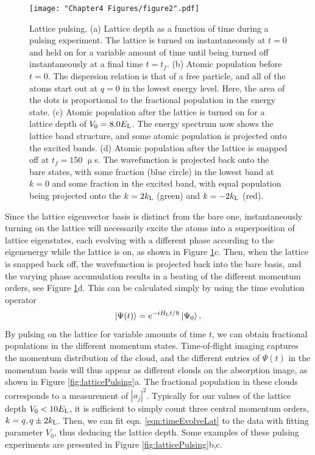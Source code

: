 \begin{figure}
\texttt{[image: "Chapter4 Figures/figure2".pdf]}
\caption[Lattice pulsing]{Lattice pulsing. (a) Lattice depth as a function of time during a pulsing experiment. The lattice is turned on instantaneously at $t=0$ and held on for a variable amount of time until being turned off instantaneously at a final time $t=t_f$. (b) Atomic population before $t=0$. The dispersion relation is that of a free particle, and all of the atoms start out at $q=0$ in the lowest energy level. Here, the area of the dots is proportional to the fractional population in the energy state. (c) Atomic population after the lattice is turned on for a lattice depth of $V_0 = 8.0 E_{\rm L}$. The energy spectrum now shows the lattice band structure, and some atomic population is projected onto the excited bands. (d) Atomic population after the lattice is snapped off at $t_f = 150$ $\upmu$s. The wavefunction is projected back onto the bare states, with some fraction (blue circle) in the lowest band at $k=0$ and some fraction in the excited band, with equal population being projected onto the $k = 2 k_{\rm L}$ (green) and $k=-2k_{\rm L}$ (red). }
\label{fig:pulsingSchematic}
\end{figure}
Since the lattice eigenvector basis is distinct from the bare one, instantaneously turning on the lattice will necessarily excite the atoms into a superposition of lattice eigenstates, each evolving with a different phase according to the eigenenergy while the lattice is on, as shown in  Figure \ref{fig:pulsingSchematic}c. Then, when the lattice is snapped back off, the wavefunction is projected back into the bare basis, and the varying phase accumulation results in a beating of the different momentum orders, see  Figure \ref{fig:pulsingSchematic}d. This can be calculated simply by using the time evolution operator
\begin{equation}
\mathinner{|{\Psi(t)}\rangle} = e^{-i H_{\rm L} t/\hbar}\mathinner{|{\Psi_0}\rangle}.
\label{eqn:timeEvolveLat}
\end{equation}
By pulsing on the lattice for variable amounts of time $t$, we can obtain fractional populations in the different momentum states. Time-of-flight imaging captures the momentum distribution of the cloud, and the different entries of $\Psi(t)$ in the momentum basis will thus appear as different clouds on the absorption image, as shown in Figure \ref{fig:latticePulsing}a. The fractional population in these clouds corresponds to a measurement of $|a_j|^2$.  Typically for our values of the lattice depth $V_0 < 10 E_{\rm L}$, it is sufficient to simply count three central momentum orders, $k = q, q \pm 2 k_{\rm L}$. Then, we can fit eqn. \ref{eqn:timeEvolveLat} to the data with fitting parameter $V_0$, thus deducing the lattice depth. Some examples of these pulsing experiments are presented in Figure \ref{fig:latticePulsing}b,c.
